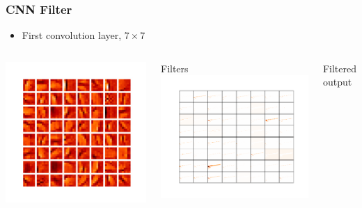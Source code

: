 \documentclass[10pt,professionalfonts,xcolor=table]{beamer}
\begin{document}
\begin{frame}
\frametitle{CNN Filter}

\begin{itemize}
\item First convolution layer, $7\times7$
\end{itemize}

\begin{columns}[b]
\centering
\includegraphics[width=\textwidth]{figures/cnn/conv1y.pdf}

Filters
\centering
\includegraphics[width=\textwidth]{figures/cnn/feat1_truetype2_caltype2_event274_y.pdf}

Filtered output
\end{columns}

\end{frame}
\end{document}
